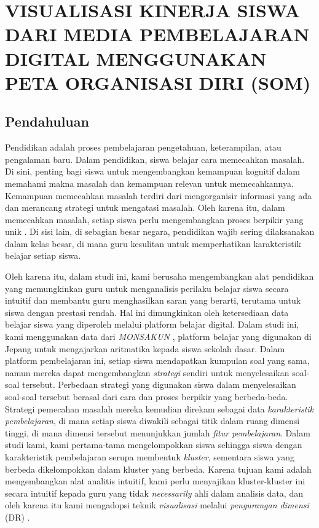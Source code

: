 \chapter{VISUALISASI KINERJA SISWA DARI MEDIA PEMBELAJARAN DIGITAL MENGGUNAKAN PETA ORGANISASI DIRI (SOM)}

\section{Pendahuluan}

    Pendidikan adalah proses pembelajaran pengetahuan, keterampilan, atau pengalaman baru. Dalam pendidikan, siswa belajar cara memecahkan masalah. Di sini, penting bagi siswa untuk mengembangkan kemampuan kognitif dalam memahami makna masalah dan kemampuan relevan untuk memecahkannya. Kemampuan memecahkan masalah terdiri dari mengorganisir informasi yang ada dan merancang strategi untuk mengatasi masalah. Oleh karena itu, dalam memecahkan masalah, setiap siswa perlu mengembangkan proses berpikir yang unik \citep{Pamitah2015}. Di sisi lain, di sebagian besar negara, pendidikan wajib sering dilaksanakan dalam kelas besar, di mana guru kesulitan untuk memperhatikan karakteristik belajar setiap siswa.
    
    Oleh karena itu, dalam studi ini, kami berusaha mengembangkan alat pendidikan yang memungkinkan guru untuk menganalisis perilaku belajar siswa secara intuitif dan membantu guru menghasilkan saran yang berarti, terutama untuk siswa dengan prestasi rendah. Hal ini dimungkinkan oleh ketersediaan data belajar siswa yang diperoleh melalui platform belajar digital. Dalam studi ini, kami menggunakan data dari \textit{MONSAKUN} \citep{Supianto2016}, platform belajar yang digunakan di Jepang untuk mengajarkan aritmatika kepada siswa sekolah dasar. Dalam platform pembelajaran ini, setiap siswa mendapatkan kumpulan soal yang sama, namun mereka dapat mengembangkan \textit{strategi} sendiri untuk menyelesaikan soal-soal tersebut. Perbedaan strategi yang digunakan siswa dalam menyelesaikan soal-soal tersebut berasal dari cara dan proses berpikir yang berbeda-beda. Strategi pemecahan masalah mereka kemudian direkam sebagai data \textit{karakteristik pembelajaran}, di mana setiap siswa diwakili sebagai titik dalam ruang dimensi tinggi, di mana dimensi tersebut menunjukkan jumlah \textit{fitur pembelajaran}. Dalam studi kami, kami pertama-tama mengelompokkan siswa sehingga siswa dengan karakteristik pembelajaran serupa membentuk \textit{kluster}, sementara siswa yang berbeda dikelompokkan dalam kluster yang berbeda. Karena tujuan kami adalah mengembangkan alat analitis intuitif, kami perlu menyajikan kluster-kluster ini secara intuitif kepada guru yang tidak \textit{necessarily} ahli dalam analisis data, dan oleh karena itu kami mengadopsi teknik \textit{visualisasi} melalui \textit{pengurangan dimensi} (DR) \citep{Kreuseler2002a}.
    

